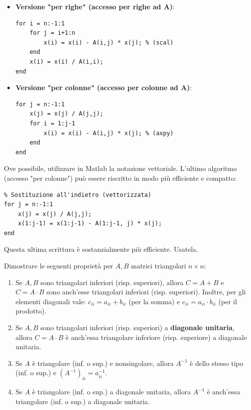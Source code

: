 \begin{itemize}
    \item \textbf{Versione "per righe" (accesso per righe ad A)}:
    \begin{lstlisting}[numbers=none, frame=none, basicstyle=\ttfamily]
% Sostituzione all'indietro (per righe)
for i = n:-1:1
    for j = i+1:n
        x(i) = x(i) - A(i,j) * x(j); % (scal)
    end
    x(i) = x(i) / A(i,i);
end
    \end{lstlisting}
    
    \item \textbf{Versione "per colonne" (accesso per colonne ad A)}:
    \begin{lstlisting}[numbers=none, frame=none, basicstyle=\ttfamily]
% Sostituzione all'indietro (per colonne)
for j = n:-1:1
    x(j) = x(j) / A(j,j);
    for i = 1:j-1
        x(i) = x(i) - A(i,j) * x(j); % (axpy)
    end
end
    \end{lstlisting}
\end{itemize}

\begin{osservazione}
Ove possibile, utilizzare in Matlab la notazione vettoriale. L'ultimo algoritmo (accesso "per colonne") può essere riscritto in modo più efficiente e compatto:
\begin{lstlisting}
% Sostituzione all'indietro (vettorizzata)
for j = n:-1:1
    x(j) = x(j) / A(j,j);
    x(1:j-1) = x(1:j-1) - A(1:j-1, j) * x(j);
end
\end{lstlisting}
Questa ultima scrittura è sostanzialmente più efficiente. Usatela.
\end{osservazione}

\begin{esercizio}
Dimostrare le seguenti proprietà per $A, B$ matrici triangolari $n \times n$:
\begin{enumerate}
    \item[A)] Se $A, B$ sono triangolari inferiori (risp. superiori), allora $C=A+B$ e $C=A \cdot B$ sono anch'esse triangolari inferiori (risp. superiori).
    Inoltre, per gli elementi diagonali vale: $c_{ii} = a_{ii} + b_{ii}$ (per la somma) e $c_{ii} = a_{ii} \cdot b_{ii}$ (per il prodotto).
    
    \item[B)] Se $A, B$ sono triangolari inferiori (risp. superiori) a \textbf{diagonale unitaria}, allora $C=A \cdot B$ è anch'essa triangolare inferiore (risp. superiore) a diagonale unitaria.
    
    \item[C)] Se $A$ è triangolare (inf. o sup.) e nonsingolare, allora $A^{-1}$ è dello stesso tipo (inf. o sup.) e $(A^{-1})_{ii} = a_{ii}^{-1}$.
    
    \item[D)] Se $A$ è triangolare (inf. o sup.) a diagonale unitaria, allora $A^{-1}$ è anch'essa triangolare (inf. o sup.) a diagonale unitaria.
\end{enumerate}
\end{esercizio}

